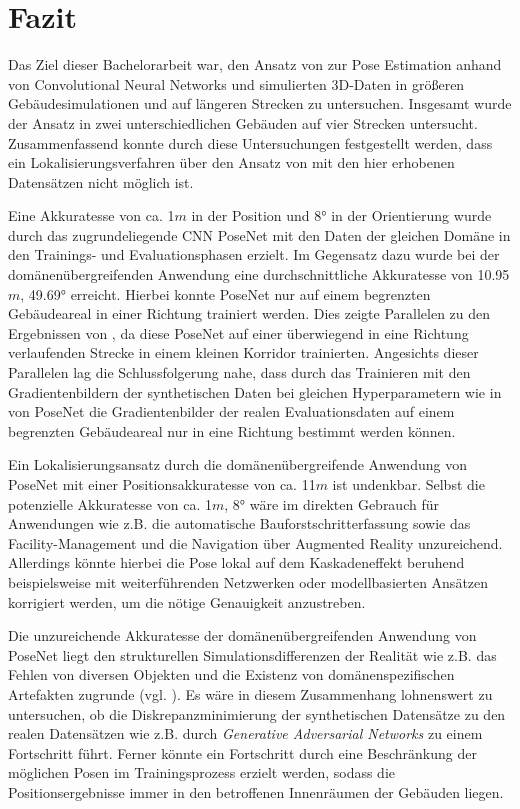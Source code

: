
\section{Fazit}
\label{sec:kapitel_6}
Das Ziel dieser Bachelorarbeit war, den Ansatz von \citet{acharyaBIMPoseNetIndoorCamera2019} zur Pose Estimation anhand von Convolutional Neural Networks und simulierten 3D-Daten in größeren Gebäudesimulationen und auf längeren Strecken zu untersuchen.
Insgesamt wurde der Ansatz in zwei unterschiedlichen Gebäuden auf vier Strecken untersucht. Zusammenfassend konnte durch diese Untersuchungen festgestellt werden, dass ein Lokalisierungsverfahren über den Ansatz von \citet{acharyaBIMPoseNetIndoorCamera2019} mit den hier erhobenen Datensätzen nicht möglich ist.


Eine Akkuratesse von ca. 1$m$ in der Position und 8° in der Orientierung wurde durch das zugrundeliegende CNN PoseNet mit den Daten der gleichen Domäne in den Trainings- und Evaluationsphasen erzielt. Im Gegensatz dazu wurde bei der domänenübergreifenden Anwendung eine durchschnittliche Akkuratesse von 10.95$m$, 49.69° erreicht. Hierbei konnte PoseNet nur auf einem begrenzten Gebäudeareal in einer Richtung trainiert werden. Dies zeigte Parallelen zu den Ergebnissen von \citet{acharyaBIMPoseNetIndoorCamera2019}, da diese PoseNet auf einer überwiegend in eine Richtung verlaufenden Strecke in einem kleinen Korridor trainierten. Angesichts dieser Parallelen lag die Schlussfolgerung nahe, dass durch das Trainieren mit den Gradientenbildern der synthetischen Daten bei gleichen Hyperparametern wie in \cite{acharyaBIMPoseNetIndoorCamera2019} von PoseNet die Gradientenbilder der realen Evaluationsdaten auf einem begrenzten Gebäudeareal nur in eine Richtung bestimmt werden können.

Ein Lokalisierungsansatz durch die domänenübergreifende Anwendung von PoseNet mit einer Positionsakkuratesse von ca. 11$m$ ist undenkbar. Selbst die potenzielle Akkuratesse von ca. 1$m$, 8° wäre im direkten Gebrauch für Anwendungen wie z.B. die automatische Bauforstschritterfassung sowie das Facility-Manage\-ment und die Navigation über Augmented Reality unzureichend. Allerdings könnte hierbei die Pose lokal auf dem Kaskadeneffekt beruhend beispielsweise mit weiterführenden Netzwerken oder modellbasierten Ansätzen korrigiert werden, um die nötige Genauigkeit anzustreben.

Die unzureichende Akkuratesse der domänenübergreifenden Anwendung von PoseNet liegt den strukturellen Simulationsdifferenzen der Realität wie z.B. das Fehlen von diversen Objekten und die Existenz von domänenspezifischen Artefakten zugrunde (vgl. \cite{acharyaBIMPoseNetIndoorCamera2019}). Es wäre in diesem Zusammenhang lohnenswert zu untersuchen, ob die Diskrepanzminimierung der synthetischen Datensätze zu den realen Datensätzen wie z.B. durch \textit{Generative Adversarial Networks} zu einem Fortschritt führt. Ferner könnte ein Fortschritt durch eine Beschränkung der möglichen Posen im Trainingsprozess erzielt werden, sodass die Positionsergebnisse immer in den betroffenen Innenräumen der Gebäuden liegen.
